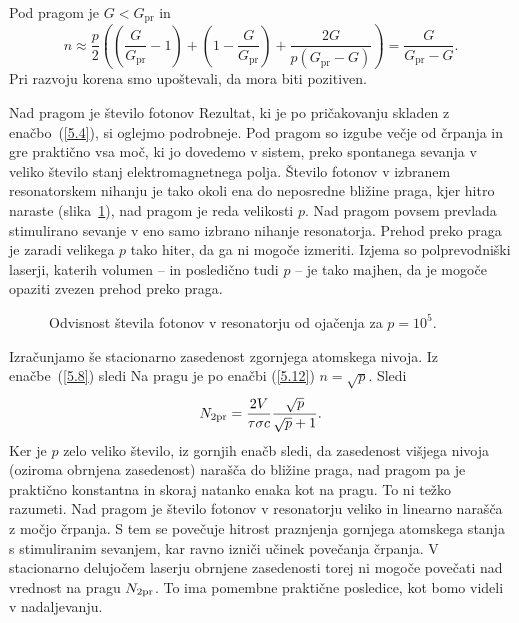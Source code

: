 Pod pragom je $G<G_\mathrm{pr}$ in 
\begin{equation}
n\approx \frac{p}{2}\left( \left(\frac{G}{G_\mathrm{pr}}-1\right)+\left(1
-\frac{G}{G_\mathrm{pr}}\right)+\frac{2G}{p(G_\mathrm{pr}-G)}\right) =\frac{G}{G_\mathrm{pr}-G}.
\label{5.13}
\end{equation}
Pri razvoju korena smo upoštevali, da mora biti pozitiven. 

Nad pragom je
število fotonov 
Rezultat, ki je po pričakovanju skladen z enačbo~(\ref{5.4}), si oglejmo podrobneje. 
Pod pragom so izgube večje od črpanja in gre praktično vsa moč, ki jo dovedemo v sistem, 
preko spontanega sevanja v veliko število stanj elektromagnetnega polja. 
Število fotonov v izbranem resonatorskem nihanju je tako okoli 
ena do neposredne bližine praga, kjer hitro naraste (slika~\ref{fig:p}), nad pragom
je reda velikosti $p$. 
Nad pragom povsem prevlada stimulirano sevanje v eno samo izbrano nihanje resonatorja. 
Prehod preko praga je zaradi velikega $p$ tako hiter, da ga ni mogoče izmeriti.
Izjema so polprevodniški laserji, katerih 
volumen -- in posledično tudi $p$ -- 
je tako majhen, da je mogoče opaziti zvezen prehod preko praga.
\begin{figure}[h]
\centering
\def\svgwidth{50truemm} 

\caption{Odvisnost števila fotonov v resonatorju od ojačenja za $p=10^5$.}
\label{fig:p}
\end{figure}

Izračunjamo še stacionarno zasedenost zgornjega atomskega nivoja. Iz 
enačbe~(\ref{5.8}) sledi
Na pragu je po enačbi (\ref{5.12}) $n=\sqrt{p}$. 
Sledi 
\begin{equation}  
N_{\rm 2pr}=\frac{2V}{\tau \sigma c}\frac{\sqrt{p}}{\sqrt{p}+1}.
\label{5.16}
\end{equation}
Ker je $p$ zelo veliko število, iz gornjih enačb sledi, da zasedenost višjega
nivoja (oziroma obrnjena zasedenost) narašča do bližine praga, nad pragom pa je praktično
konstantna in skoraj natanko enaka kot na pragu. To ni težko razumeti. Nad
pragom je število fotonov v resonatorju veliko in linearno narašča 
z močjo črpanja. S tem se povečuje hitrost praznjenja gornjega atomskega 
stanja s stimuliranim sevanjem, kar ravno izniči učinek povečanja črpanja. 
V stacionarno delujočem laserju obrnjene zasedenosti torej ni mogoče povečati 
nad vrednost na pragu $N_{\rm 2pr}$. To ima pomembne praktične posledice, kot bomo
videli v nadaljevanju.

